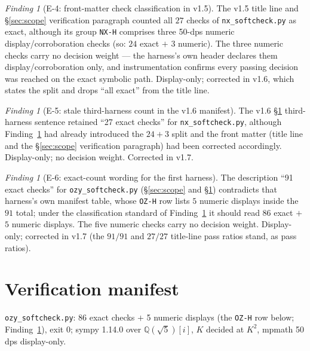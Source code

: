 \documentclass[11pt]{article}
\newcommand{\hx}[1]{\textcolor{cC}{\footnotesize\texttt{#1}}}
\newcommand{\Q}{\mathbb{Q}}
\theoremstyle{plain}
\theoremstyle{definition}
\theoremstyle{remark}
\newtheorem{finding}[theorem]{Finding}
\begin{document}
\begin{finding}[E-4: front-matter check classification in v1.5]\label{find:hcount}
The v1.5 title line and \S\ref{sec:scope} verification paragraph counted
all $27$ checks of \texttt{nx\_softcheck.py} as exact, although its group
\hx{NX-H} comprises three 50-dps numeric display/corroboration checks
(so: $24$ exact $+$ $3$ numeric). The three numeric checks carry no
decision weight --- the harness's own header declares them
display/corroboration only, and instrumentation confirms every passing
decision was reached on the exact symbolic path. Display-only; corrected
in v1.6, which states the split and drops ``all exact'' from the title
line.
\end{finding}

\begin{finding}[E-5: stale third-harness count in the v1.6 manifest]\label{find:manifeststale}
The v1.6 \S\ref{sec:verification} third-harness sentence retained ``27
exact checks'' for \texttt{nx\_softcheck.py}, although
Finding~\ref{find:hcount} had already introduced the $24+3$ split and the
front matter (title line and the \S\ref{sec:scope} verification paragraph)
had been corrected accordingly. Display-only; no decision weight.
Corrected in v1.7.
\end{finding}

\begin{finding}[E-6: exact-count wording for the first harness]\label{find:ozsplit}
The description ``91 exact checks'' for \texttt{ozy\_softcheck.py}
(\S\ref{sec:scope} and \S\ref{sec:verification}) contradicts that
harness's own manifest table, whose \hx{OZ-H} row lists $5$ numeric
displays inside the $91$ total; under the classification standard of
Finding~\ref{find:hcount} it should read $86$ exact $+$ $5$ numeric
displays. The five numeric checks carry no decision weight. Display-only;
corrected in v1.7 (the $91/91$ and $27/27$ title-line pass ratios stand,
as pass ratios).
\end{finding}

\section{Verification manifest}\label{sec:verification}

\texttt{ozy\_softcheck.py}: 86 exact checks $+$ 5 numeric displays (the
\hx{OZ-H} row below; Finding~\ref{find:ozsplit}), exit 0; sympy 1.14.0 over
$\Q(\sqrt5)[i]$, $K$ decided at $K^2$, mpmath 50 dps display-only.
\end{document}
